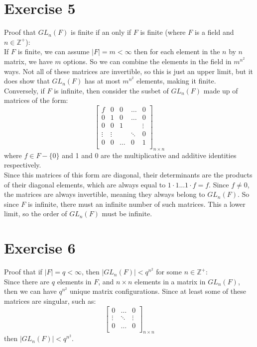 \documentclass{article}
\newcommand{\Z}{\mathbb{Z}}
\begin{document}
    \section*{Exercise 5}
    Proof that $GL_n(F)$ is finite if an only if $F$ is finite
    (where $F$ is a field and $n \in \Z^+$): \\
    If $F$ is finite, we can assume $|F| = m < \infty$
    then for each element in the $n$ by $n$ matrix, we have $m$ options.
    So we can combine the elements in the field in $m^{n^2}$ ways.
    Not all of these matrices are invertible,
    so this is just an upper limit,
    but it does show that $GL_n(F)$ has at most $m^{n^2}$ elements,
    making it finite. \\
    Conversely, if $F$ is infinite,
    then consider the susbet of $GL_n(F)$ made up of matrices of the form:
    \[\begin{bmatrix}
    f & 0 & 0 & \dots & 0\\
    0 & 1 & 0 & \dots & 0 \\
    0 & 0 & 1 & & \vdots \\
    \vdots & \vdots & & \ddots & 0\\ 
    0 & 0 & \dots & 0 & 1 \\
    \end{bmatrix}_{n \times n}\]
    where $f \in F - \{0\}$ and 1 and 0 are the multiplicative and
    additive identities respectively. \\
    Since this matrices of this form are diagonal,
    their determinants are the products of their diagonal elements,
    which are always equal to $1 \cdot 1 ... 1 \cdot f = f$.
    Since $f \neq 0$, the matrices are always invertible, meaning
    they always belong to $GL_n(F)$.
    So since $F$ is infinite, there must an infinite number of
    such matrices.
    This a lower limit, so the order of $GL_n(F)$ must be infinite.


    \section*{Exercise 6}
    Proof that if $|F| = q < \infty$,
    then $|GL_n(F)| < q^{n^2}$ for some $n \in \Z^+$: \\
    Since there are $q$ elements in $F$,
    and $n \times n$ elements in a matrix in $GL_n(F)$, 
    then we can have $q^{n^2}$ unique matrix configurations.
    Since at least some of these matrices are singular, such as:
    \[\begin{bmatrix}
    0 & \dots & 0\\
    \vdots & \ddots & \vdots \\ 
    0 & \dots & 0 \\
    \end{bmatrix}_{n \times n}\]
    then $|GL_n(F)| < q^{n^2}$.
\end{document}
